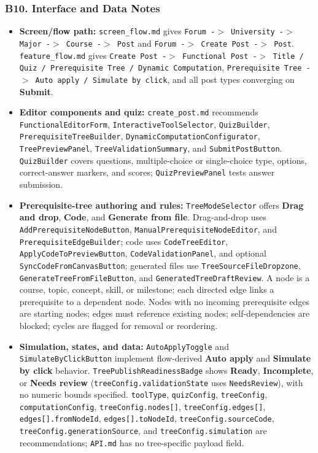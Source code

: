 \documentclass[12pt]{article}
\begin{document}
\hypertarget{sec:b10-interface-and-data-notes}{}
\subsubsection*{B10. Interface and Data Notes}
\par\medskip

\begin{itemize}
\item \textbf{Screen/flow path:} \texttt{screen\_flow.md} gives \texttt{Forum -$>$ University -$>$ Major -$>$ Course -$>$ Post} and \texttt{Forum -$>$ Create Post -$>$ Post}. \texttt{feature\_flow.md} gives \texttt{Create Post -$>$ Functional Post -$>$ Title / Quiz / Prerequisite Tree / Dynamic Computation}, \texttt{Prerequisite Tree -$>$ Auto apply / Simulate by click}, and all post types converging on \textbf{Submit}.
\item \textbf{Editor components and quiz:} \texttt{create\_post.md} recommends \texttt{FunctionalEditorForm}, \texttt{InteractiveToolSelector}, \texttt{QuizBuilder}, \texttt{PrerequisiteTreeBuilder}, \texttt{DynamicComputationConfigurator}, \texttt{TreePreviewPanel}, \texttt{TreeValidationSummary}, and \texttt{SubmitPostButton}. \texttt{QuizBuilder} covers questions, multiple-choice or single-choice type, options, correct-answer markers, and scores; \texttt{QuizPreviewPanel} tests answer submission.
\item \textbf{Prerequisite-tree authoring and rules:} \texttt{TreeModeSelector} offers \textbf{Drag and drop}, \textbf{Code}, and \textbf{Generate from file}. Drag-and-drop uses \texttt{AddPrerequisiteNodeButton}, \texttt{ManualPrerequisiteNodeEditor}, and \texttt{PrerequisiteEdgeBuilder}; code uses \texttt{CodeTreeEditor}, \texttt{ApplyCodeToPreviewButton}, \texttt{CodeValidationPanel}, and optional \texttt{SyncCodeFromCanvasButton}; generated files use \texttt{TreeSourceFileDropzone}, \texttt{GenerateTreeFromFileButton}, and \texttt{GeneratedTreeDraftReview}. A node is a course, topic, concept, skill, or milestone; each directed edge links a prerequisite to a dependent node. Nodes with no incoming prerequisite edges are starting nodes; edges must reference existing nodes; self-dependencies are blocked; cycles are flagged for removal or reordering.
\item \textbf{Simulation, states, and data:} \texttt{AutoApplyToggle} and \texttt{SimulateByClickButton} implement flow-derived \textbf{Auto apply} and \textbf{Simulate by click} behavior. \texttt{TreePublishReadinessBadge} shows \textbf{Ready}, \textbf{Incomplete}, or \textbf{Needs review} (\texttt{treeConfig.validationState} uses \texttt{NeedsReview}), with no numeric bounds specified. \texttt{toolType}, \texttt{quizConfig}, \texttt{treeConfig}, \texttt{computationConfig}, \texttt{treeConfig.nodes[]}, \texttt{treeConfig.edges[]}, \texttt{edges[].fromNodeId}, \texttt{edges[].toNodeId}, \texttt{treeConfig.sourceCode}, \texttt{treeConfig.generationSource}, and \texttt{treeConfig.simulation} are recommendations; \texttt{API.md} has no tree-specific payload field.

\end{itemize}
\end{document}
